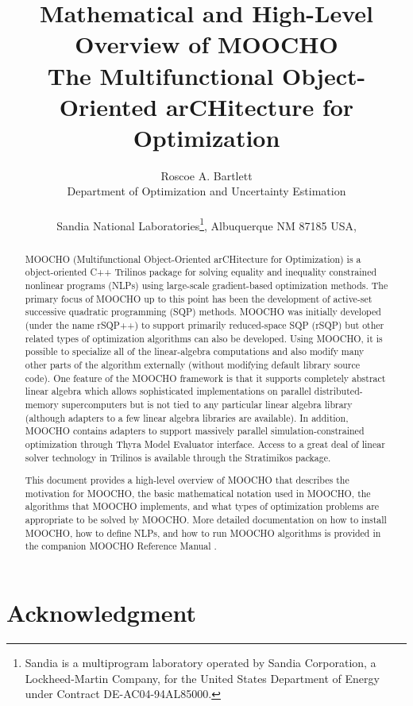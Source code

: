 \documentclass[pdf,12pt,report]{SANDreport}
\title{
\center
Mathematical and High-Level Overview of MOOCHO \\[2ex]
The Multifunctional Object-Oriented arCHitecture for Optimization
}
\author{
Roscoe A. Bartlett \\ Department of Optimization and Uncertainty Estimation \\ \\
Sandia National Laboratories\footnote{ Sandia is a multiprogram laboratory operated
by Sandia Corporation, a Lockheed-Martin Company, for the United States Department of
Energy under Contract DE-AC04-94AL85000.}, Albuquerque NM 87185 USA, \\ }
\date{}
\begin{document}
\maketitle

%

%
\begin{abstract}
%

MOOCHO (Multifunctional Object-Oriented arCHitecture for Optimization) is a
object-oriented C++ Trilinos package for solving equality and inequality
constrained nonlinear programs (NLPs) using large-scale gradient-based
optimization methods.  The primary focus of MOOCHO up to this point has been
the development of active-set successive quadratic programming (SQP) methods.
MOOCHO was initially developed (under the name rSQP++) to support primarily
reduced-space SQP (rSQP) but other related types of optimization algorithms
can also be developed.  Using MOOCHO, it is possible to specialize all of the
linear-algebra computations and also modify many other parts of the algorithm
externally (without modifying default library source code).  One feature of
the MOOCHO framework is that it supports completely abstract linear algebra
which allows sophisticated implementations on parallel distributed-memory
supercomputers but is not tied to any particular linear algebra library
(although adapters to a few linear algebra libraries are available).  In
addition, MOOCHO contains adapters to support massively parallel
simulation-constrained optimization through Thyra Model Evaluator interface.
Access to a great deal of linear solver technology in Trilinos is available
through the Stratimikos package.

This document provides a high-level overview of MOOCHO that describes the
motivation for MOOCHO, the basic mathematical notation used in MOOCHO, the
algorithms that MOOCHO implements, and what types of optimization problems are
appropriate to be solved by MOOCHO.  More detailed documentation on how to
install MOOCHO, how to define NLPs, and how to run MOOCHO algorithms is
provided in the companion MOOCHO Reference Manual {}\cite{ref:moochorefguide}.

%
\end{abstract}
%


%
\clearpage
\section*{Acknowledgment}
\end{document}
